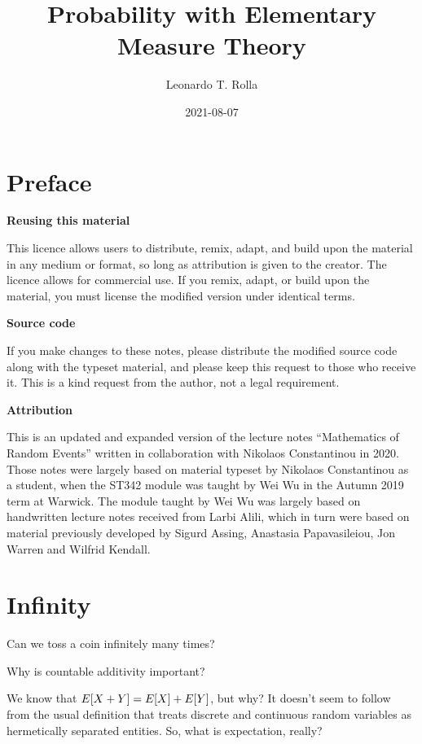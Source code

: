 \documentclass[
]{book}
\title{Probability with Elementary Measure Theory}
\author{Leonardo T. Rolla}
\date{2021-08-07}
\theoremstyle{definition}
\theoremstyle{remark}
\let\mathbb\relax %
\newcommand{\E}{\mathbb{E}}
\begin{document}
\maketitle

{
\setcounter{tocdepth}{1}
\tableofcontents
}
\hypertarget{preface}{%
\chapter*{Preface}\label{preface}}

\textbf{Reusing this material}

This licence allows users to distribute, remix, adapt, and build upon
the material in any medium or format, so long as attribution is given to
the creator. The licence allows for commercial use. If you remix, adapt,
or build upon the material, you must license the modified version under
identical terms.

\textbf{Source code}

If you make changes to these notes, please distribute the modified
source code along with the typeset material, and please keep this
request to those who receive it. This is a kind request from the author,
not a legal requirement.

\textbf{Attribution}

This is an updated and expanded version of the lecture notes
``Mathematics of Random Events'' written in collaboration with Nikolaos
Constantinou in 2020. Those notes were largely based on material typeset
by Nikolaos Constantinou as a student, when the ST342 module was taught
by Wei Wu in the Autumn 2019 term at Warwick. The module taught by Wei
Wu was largely based on handwritten lecture notes received from Larbi
Alili, which in turn were based on material previously developed by
Sigurd Assing, Anastasia Papavasileiou, Jon Warren and Wilfrid Kendall.

\hypertarget{sec:intro}{%
\chapter{Infinity}\label{sec:intro}}

Can we toss a coin infinitely many times?

Why is countable additivity important?

We know that \(\E[X+Y]=\E[X] + \E[Y]\), but why? It doesn't seem to follow
from the usual definition that treats discrete and continuous random
variables as hermetically separated entities. So, what is expectation,
really?
\end{document}
